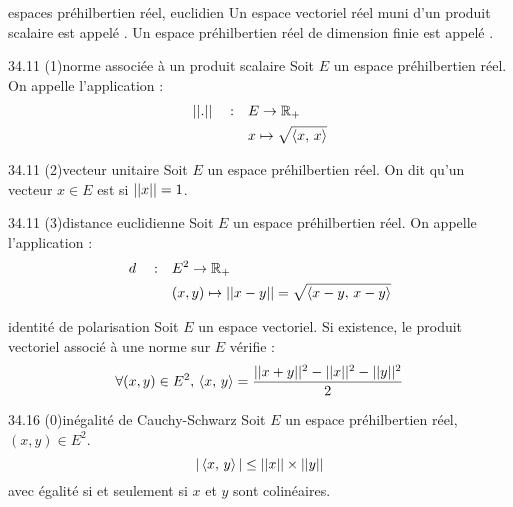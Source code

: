 

\begin{adjustwidth}{-3cm}{-3cm}



\begin{definition}{34.1}{espaces préhilbertien réel, euclidien}
    Un espace vectoriel réel muni d’un produit scalaire est appelé . 
    Un espace préhilbertien réel de dimension finie est appelé .
\end{definition}

\begin{definition}{34.11 (1)}{norme associée à un produit scalaire}
    Soit $E$ un espace préhilbertien réel. On appelle  l'application :
    \begin{align*}
        ||.||\quad:\quad&E \to \mathbb{R}_+ \\
        &x \mapsto \sqrt{\left\langle x ,\, x \right\rangle}
    \end{align*}
    
\end{definition}

\begin{definition}{34.11 (2)}{vecteur unitaire}
    Soit $E$ un espace préhilbertien réel. On dit qu'un vecteur $x \in E$ est  si $||x|| = 1$. 
    
\end{definition}

\begin{definition}{34.11 (3)}{distance euclidienne}
    Soit $E$ un espace préhilbertien réel. On appelle  l'application :
    \begin{align*}
        d\quad:\quad&E^2 \to \mathbb{R}_+ \\
        &(x,y) \mapsto ||x-y|| = \sqrt{\left\langle x-y ,\, x-y \right\rangle}
    \end{align*}
\end{definition}

\begin{proposition}{34.15}{identité de polarisation}
    Soit $E$ un espace vectoriel. Si existence, le produit vectoriel associé à une norme sur $E$ vérifie :\\
    $$\forall (x,y) \in E^2,\, \left\langle x ,\, y \right\rangle = \frac{||x+y||^2 - ||x||^2 - ||y||^2}{2}$$
\end{proposition}

\begin{theoreme}{34.16 (0)}{inégalité de Cauchy-Schwarz}
    Soit $E$ un espace préhilbertien réel, $(x,y) \in E^2$.
    $$|\left\langle x ,\, y \right\rangle| \leq ||x|| \times ||y||$$
    avec égalité si et seulement si $x$ et $y$ sont colinéaires.
\end{theoreme}


\end{adjustwidth}
